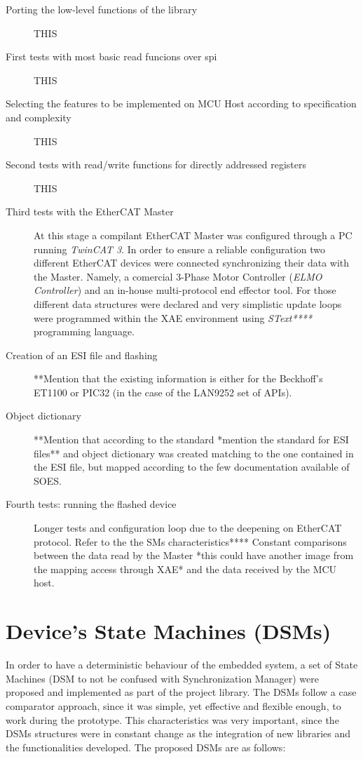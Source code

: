 \begin{description}
\item[Porting the low-level functions of the library] THIS
\item[First tests with most basic read funcions over spi] THIS
\item[Selecting the features to be implemented on MCU Host according to specification and complexity] THIS
\item[Second tests with read/write functions for directly addressed registers] THIS
\item[Third tests with the EtherCAT Master] At this stage a compilant EtherCAT Master was configured through a PC running \emph{TwinCAT 3}. In order to ensure a reliable configuration two different EtherCAT devices were connected synchronizing their data with the Master. Namely, a comercial 3-Phase Motor Controller (\emph{ELMO Controller}) and an in-house multi-protocol end effector tool. For those different data structures were declared and very simplistic update loops were programmed within the XAE environment using \emph{SText****} programming language.
\item[Creation of an ESI file and flashing] **Mention that the existing information is either for the Beckhoff's ET1100 or PIC32 (in the case of the LAN9252 set of APIs).
\item[Object dictionary] **Mention that according to the standard *mention the standard for ESI files** and object dictionary was created matching to the one contained in the ESI file, but mapped according to the few documentation available of SOES.
\item[Fourth tests: running the flashed device] Longer tests and configuration loop due to the deepening on EtherCAT protocol. Refer to the the SMs characteristics**** Constant comparisons between the data read by the Master *this could have another image from the mapping access through XAE* and the data received by the MCU host.
\end{description}


\section{Device's State Machines (DSMs)}

In order to have a deterministic behaviour of the embedded system, a set of State Machines (DSM to not be confused with Synchronization Manager) were proposed and implemented as part of the project library. 
The DSMs follow a case comparator approach, since it was simple, yet effective and flexible enough, to work during the prototype. 
This characteristics was very important, since the DSMs structures were in constant change as the integration of new libraries and the functionalities developed. 
The proposed DSMs are as follows:

